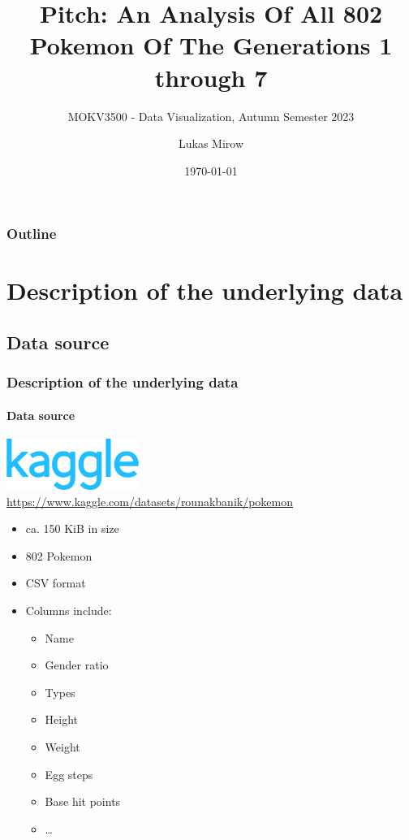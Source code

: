 \documentclass{beamer}
\title{Pitch: An Analysis Of All 802 Pokemon Of The Generations 1 through 7}
\subtitle{MOKV3500 - Data Visualization, Autumn Semester 2023}
\author{Lukas Mirow}
\institute{Oslo Metropolitain University}
\date{\today}
\begin{document}
	\begin{frame}
		\titlepage
	\end{frame}
	\begin{frame}
		\frametitle{Outline}
		\tableofcontents
	\end{frame}
	\section{Description of the underlying data}
		\subsection{Data source}
			\begin{frame}
				\frametitle{Description of the underlying data}
				\framesubtitle{Data source}
				\begin{center}
					\includegraphics[scale=0.5]{kaggle-logo.png}
					\href{https://www.kaggle.com/datasets/rounakbanik/pokemon}{https://www.kaggle.com/datasets/rounakbanik/pokemon}
					\begin{itemize}
						\item ca. 150 KiB in size
						\item 802 Pokemon
						\item CSV format
						\item Columns include:
						\begin{itemize}
							\item Name
							\item Gender ratio
							\item Types
							\item Height
							\item Weight
							\item Egg steps
							\item Base hit points
							\item \dots
						\end{itemize}
					\end{itemize}
				\end{center}
			\end{frame}
\end{document}
